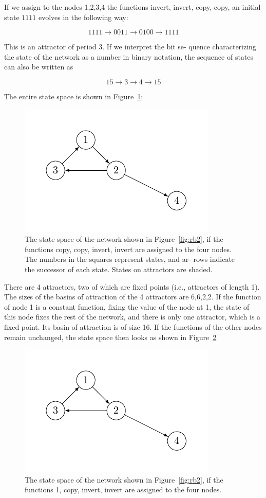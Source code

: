 If we assign to the nodes 1,2,3,4 the functions invert,
invert, copy, copy, an initial state $1111$ evolves in the
following way:

$$
1111 \to 0011 \to 0100 \to 1111
$$

This is an attractor of period 3. If we interpret the bit se-
quence characterizing the state of the network as a number in binary notation, the sequence of states can also be
written as

$$
15 \to 3 \to 4 \to 15
$$

The entire state space is shown in Figure~\ref{fig:rb3}:
\begin{figure}[h]
\centering
\includegraphics[scale=1]{figurenetworks2.pdf}
\caption{The state space of the network shown in Figure~\ref{fig:rb2}, if
the functions copy, copy, invert, invert are assigned to the four
nodes. The numbers in the squares represent states, and ar-
rows indicate the successor of each state. States on attractors
are shaded.}
\label{fig:rb3}
\end{figure}

There are 4 attractors, two of which are fixed points
(i.e., attractors of length 1). The sizes of the basins of
attraction of the 4 attractors are 6,6,2,2. If the function
of node 1 is a constant function, fixing the value of the
node at 1, the state of this node fixes the rest of the
network, and there is only one attractor, which is a fixed
point. Its basin of attraction is of size 16. If the functions
of the other nodes remain unchanged, the state space
then looks as shown in Figure~\ref{fig:rb4}

\begin{figure}[h]
\centering
\includegraphics[scale=1]{figurenetworks2.pdf}
\caption{The state space of the network shown in Figure~\ref{fig:rb2},
if the functions 1, copy, invert, invert are assigned to the four
nodes.}
\label{fig:rb4}
\end{figure}

